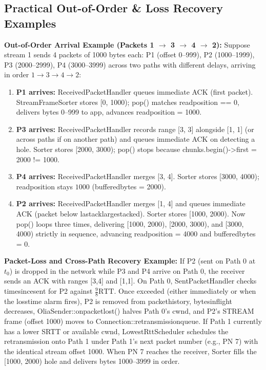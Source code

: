 \documentclass[10pt,a4paper]{article}
\newcommand{\codeul}{\textunderscore\hspace{0pt}}
\DeclareRobustCommand{\code}[1]{{\ttfamily\let\_\codeul #1}}
\begin{document}
\subsection{Practical Out-of-Order \& Loss Recovery Examples}
\textbf{Out-of-Order Arrival Example (Packets 1 $\rightarrow$ 3 $\rightarrow$ 4 $\rightarrow$ 2):}
Suppose stream 1 sends 4 packets of 1000 bytes each: P1 (offset 0--999), P2 (1000--1999), P3 (2000--2999), P4 (3000--3999) across two paths with different delays, arriving in order $1 \rightarrow 3 \rightarrow 4 \rightarrow 2$:
\begin{enumerate}
    \item \textbf{P1 arrives:} \code{ReceivedPacketHandler} queues immediate ACK (first packet). \code{StreamFrameSorter} stores \code{[0, 1000)}; \code{pop()} matches \code{read\_position == 0}, delivers bytes 0--999 to app, advances \code{read\_position = 1000}.
    \item \textbf{P3 arrives:} \code{ReceivedPacketHandler} records range \code{[3, 3]} alongside \code{[1, 1]} (or across paths if on another path) and queues immediate ACK on detecting a hole. \code{Sorter} stores \code{[2000, 3000)}; \code{pop()} stops because \code{chunks.begin()->first = 2000 != 1000}.
    \item \textbf{P4 arrives:} \code{ReceivedPacketHandler} merges \code{[3, 4]}. \code{Sorter} stores \code{[3000, 4000)}; \code{read\_position} stays $1000$ (\code{buffered\_bytes = 2000}).
    \item \textbf{P2 arrives:} \code{ReceivedPacketHandler} merges \code{[1, 4]} and queues immediate ACK (packet below \code{last\_ack\_largest\_acked}). \code{Sorter} stores \code{[1000, 2000)}. Now \code{pop()} loops three times, delivering \code{[1000, 2000)}, \code{[2000, 3000)}, and \code{[3000, 4000)} strictly in sequence, advancing \code{read\_position = 4000} and \code{buffered\_bytes = 0}.
\end{enumerate}

\textbf{Packet-Loss and Cross-Path Recovery Example:}
If P2 (sent on Path 0 at $t_0$) is dropped in the network while P3 and P4 arrive on Path 0, the receiver sends an ACK with ranges \code{[3,4]} and \code{[1,1]}. On Path 0, \code{SentPacketHandler} checks \code{time\_since\_sent} for P2 against $\frac{9}{8}\text{RTT}$. Once exceeded (either immediately or when the \code{loss\_time} alarm fires), P2 is removed from \code{packet\_history}, \code{bytes\_in\_flight} decreases, \code{OliaSender::on\_packet\_lost()} halves Path 0's \code{cwnd}, and P2's \code{STREAM} frame (offset 1000) moves to \code{Connection::retransmission\_queue}. If Path 1 currently has a lower SRTT or available \code{cwnd}, \code{LowestRttScheduler} schedules the retransmission onto Path 1 under Path 1's next packet number (e.g., PN 7) with the identical stream offset \code{1000}. When PN 7 reaches the receiver, \code{Sorter} fills the \code{[1000, 2000)} hole and delivers bytes 1000--3999 in order.
\end{document}
